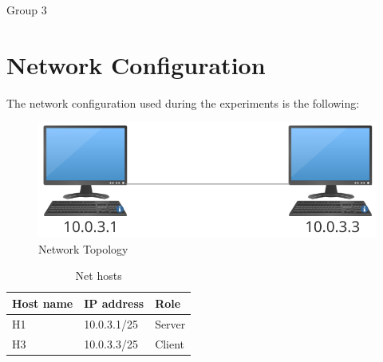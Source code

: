 \documentclass{exam}
\begin{document}
\newcommand{\LoggaEng}{
	\textsc{\Huge Uppsala University}\\[0.7cm]
	\texttt{[image: Uppsala\_University\_seal\_svg.png]}\\[0.5cm]
}

\begin{titlepage}

	\center


	\LoggaSwe


	\Large Group 3\\

	\vfill

\end{titlepage}
\pagebreak

\section{Network Configuration}

The network configuration used during the experiments is the following:

\begin{figure}[H]
    \centering
    \includegraphics[width=0.30\linewidth]{network-topology.png}
    \caption{Network Topology}
    \label{fig:enter-label}
\end{figure}
\begin{table}[H]
  \begin{center}
    \begin{tabular}{|l|l|l|}
      \hline
      \textbf{Host name} & \textbf{IP address} & Role \\
      \hline
      H1 & 10.0.3.1/25 & Server \\
      \hline
      H3 & 10.0.3.3/25  & Client \\
      \hline
    \end{tabular}
  \end{center}
  \caption{Net hosts}\label{tab:net-hosts}
\end{table}
\end{document}
